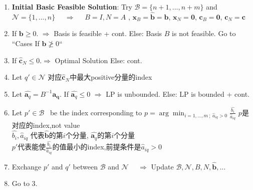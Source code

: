 \documentclass[9pt]{article}
\begin{document}
\begin{enumerate}[itemsep=-2pt, topsep=-2pt]
    \item {\small \textbf{Initial Basic Feasible Solution}: Try $\mathcal{B}=\{n+1,...,n+m\}$ and $\mathcal{N}=\{1,...,n\}$ \ \ $\Rightarrow$ \ \ $B=I,N=A$ , $\mathbf{x}_B=\widehat{\mathbf{b}}=\mathbf{b}$, $\mathbf{x}_N=\mathbf{0}$, $\mathbf{c}_B=\mathbf{0}$, $\mathbf{c}_N=\mathbf{c}$}
    \item If $\mathbf{b}\geq0$. $\Rightarrow$ Basis is feasible + cont. \qquad Else: Basis $B$ is not feasible. \quad Go to ``Cases If $\mathbf{b}\ngeq0$``
    \item If $\widehat{\mathbf{c}}_N\leq0. \Rightarrow$ Optimal Solution \qquad Else: cont.
    \item Let $q'\in\mathcal{N}$ {\small 对应$\widehat{\mathbf{c}}_N$中最大positive分量的index}   
    \item Let $\widehat{\mathbf{a}_q}=B^{-1}\mathbf{a_q}$. \qquad If $\widehat{\mathbf{a}_q}\leq0$ $\Rightarrow$ LP is unbounded. \qquad Else: LP is bounded + cont.
    \item Let $p'\in\mathcal{B}$ \ be the index corresponding to $p=\arg\min_{i=1,...,m \ ; \ \widehat{a}_{iq}>0}\frac{\widehat{b_i}}{\widehat{a}_{iq}}$ {\scriptsize $p$是对应的index,not value} \qquad {}\\
    $\widehat{b_i},\widehat{a}_{iq}$ {\small 代表$\widehat{\mathbf{b}}$的第$i$个分量, $\widehat{\mathbf{a}_q}$的第$i$个分量} \\
    {\small $p'$代表能使$\frac{\widehat{b_i}}{\widehat{a}_{iq}}$的值最小的index,前提条件是$\widehat{a}_{iq}>0$} \qquad {}
    \item Exchange $p'$ and $q'$ between $\mathcal{B}$ and $\mathcal{N}$ \ \ $\Rightarrow$ \qquad Update $\mathcal{B},\mathcal{N},B,N,\widehat{\mathbf{b}},...$ 
    \item Go to 3.
\end{enumerate}
\end{document}
